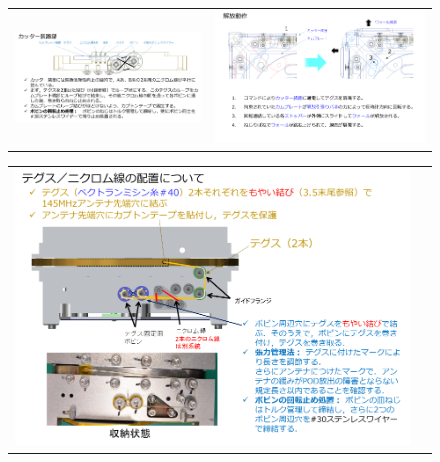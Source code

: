 \begin{figure}[H]
\begin{tabular}{cc}
		\begin{minipage}{0.5\hsize}
			\begin{center}
				\includegraphics[width=1\textwidth]{03/fig/3-9-3-1-20.png}
			\end{center}
		\end{minipage}&
		\begin{minipage}{0.5\hsize}
			\begin{center}
				\includegraphics[width=1\textwidth]{03/fig/3-9-3-1-21.png}
			\end{center}
		\end{minipage}
	\end{tabular}
				\begin{tabular}{cc}
			\begin{minipage}{0.5\hsize}
				\begin{center}
					\includegraphics[width=.7\textwidth]{03/fig/3-9-3-1-22.png}

\end{center}
\end{minipage}
\end{tabular}
\end{figure}
